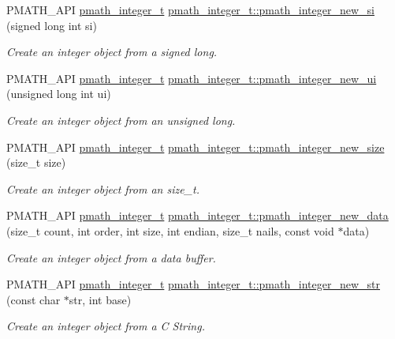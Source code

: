 \begin{CompactItemize}
PMATH\_\-API \hyperlink{classpmath__integer__t}{pmath\_\-integer\_\-t} \hyperlink{group__numbers_g34c4815ce444a7dd88a19335098c8c5b}{pmath\_\-integer\_\-t::pmath\_\-integer\_\-new\_\-si} (signed long int si)
\begin{CompactList}\small\item\em Create an integer object from a signed long. \item\end{CompactList}\item 
PMATH\_\-API \hyperlink{classpmath__integer__t}{pmath\_\-integer\_\-t} \hyperlink{group__numbers_ga7704c11e6f72b8403db246f6862d4c6}{pmath\_\-integer\_\-t::pmath\_\-integer\_\-new\_\-ui} (unsigned long int ui)
\begin{CompactList}\small\item\em Create an integer object from an unsigned long. \item\end{CompactList}\item 
PMATH\_\-API \hyperlink{classpmath__integer__t}{pmath\_\-integer\_\-t} \hyperlink{group__numbers_g5fecb78f68ce62c05b1970cf1cf17dc6}{pmath\_\-integer\_\-t::pmath\_\-integer\_\-new\_\-size} (size\_\-t size)
\begin{CompactList}\small\item\em Create an integer object from an size\_\-t. \item\end{CompactList}\item 
PMATH\_\-API \hyperlink{classpmath__integer__t}{pmath\_\-integer\_\-t} \hyperlink{group__numbers_g7ffd98a7d3634c79d261b67f76b1d011}{pmath\_\-integer\_\-t::pmath\_\-integer\_\-new\_\-data} (size\_\-t count, int order, int size, int endian, size\_\-t nails, const void $\ast$data)
\begin{CompactList}\small\item\em Create an integer object from a data buffer. \item\end{CompactList}\item 
PMATH\_\-API \hyperlink{classpmath__integer__t}{pmath\_\-integer\_\-t} \hyperlink{group__numbers_gaca3cb69b051e8f361784f2dc3836fcf}{pmath\_\-integer\_\-t::pmath\_\-integer\_\-new\_\-str} (const char $\ast$str, int base)
\begin{CompactList}\small\item\em Create an integer object from a C String. \item\end{CompactList}\item 

\end{CompactItemize}
